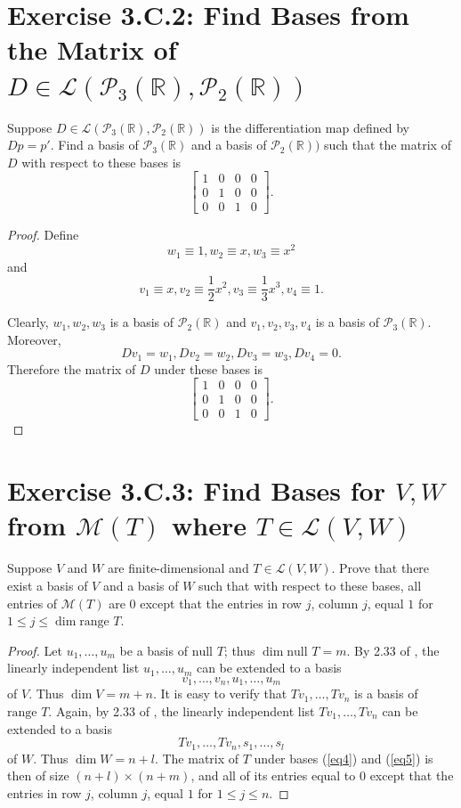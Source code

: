 \section{Exercise 3.C.2: Find Bases from the Matrix of $D\in\mathcal{L}(\mathcal{P}_3(\mathbb{R}),\mathcal{P}_2(\mathbb{R}))$}
Suppose $D\in\mathcal{L}(\mathcal{P}_3(\mathbb{R}),\mathcal{P}_2(\mathbb{R}))$ is the differentiation map defined by $Dp=p'$. Find a basis of $\mathcal{P}_3(\mathbb{R})$ and a basis of $\mathcal{P}_2(\mathbb{R}))$ such that the matrix of $D$ with respect to these bases is\[
\begin{bmatrix}
1&0&0&0\\
0&1&0&0\\
0&0&1&0
\end{bmatrix}.
\]
\begin{proof}
Define\[
w_1\equiv1, w_2\equiv x, w_3\equiv x^2
\]and\[
v_1\equiv x, v_2\equiv\frac{1}{2}x^2, v_3\equiv\frac{1}{3}x^3, v_4\equiv1.
\]

Clearly, $w_1,w_2,w_3$ is a basis of $\mathcal{P}_2(\mathbb{R})$ and $v_1,v_2,v_3,v_4$ is a basis of $\mathcal{P}_3(\mathbb{R})$. Moreover, \[
Dv_1=w_1,Dv_2=w_2,Dv_3=w_3,Dv_4=0.
\]Therefore the matrix of $D$ under these bases is \[
\begin{bmatrix}
1&0&0&0\\
0&1&0&0\\
0&0&1&0
\end{bmatrix}.
\]
\end{proof}
\section{Exercise 3.C.3: Find Bases for $V, W$ from $\mathcal{M}(T)$ where $T\in\mathcal{L}(V,W)$}
Suppose $V$ and $W$ are finite-dimensional and $T\in\mathcal{L}(V,W)$. Prove that there exist a basis of $V$ and a basis of $W$ such that with respect to these bases, all entries of $\mathcal{M}(T)$ are $0$ except that the entries in row $j$, column $j$, equal $1$ for $1\leqslant j\leqslant\dim\text{range }T$.
\begin{proof}
Let $u_1,\dots,u_m$ be a basis of $\text{null }T$; thus $\dim\text{null }T=m$. By 2.33 of \cite{axler2014linear}, the linearly independent list $u_1,\dots,u_m$ can be extended to a basis
\begin{equation}
\label{eq4}
v_1,\dots,v_n,u_1,\dots,u_m
\end{equation}
of $V$. Thus $\dim V=m+n$. It is easy to verify that $Tv_1,\dots,Tv_n$ is a basis of $\text{range }T$. Again, by 2.33 of \cite{axler2014linear}, the linearly independent list $Tv_1,\dots,Tv_n$ can be extended to a basis
\begin{equation}
\label{eq5}
Tv_1,\dots,Tv_n,s_1,\dots,s_l
\end{equation}
of $W$. Thus $\dim W=n+l$. The matrix of $T$ under bases (\ref{eq4}) and (\ref{eq5}) is then of size $(n+l)\times(n+m)$, and all of its entries equal to $0$ except that the entries in row $j$, column $j$, equal $1$ for $1\leqslant j\leqslant n$.
\end{proof}
